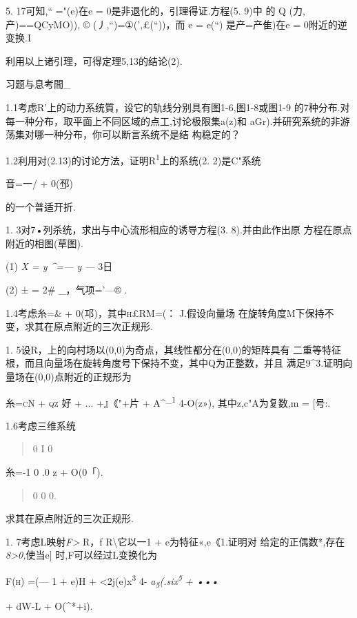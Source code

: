 \documentclass{article}
\begin{document}
5. 17可知,`` ="(e)在e = 0是非退化的，引理得证.方程(5. 9)中 的 Q
(力,产)==QCyMO)), © (丿,``)=①(',£(``))，而 e = e(``) 是产=产隹)在e =
0附近的逆变换.I

利用以上诸引理，可得定理5,13的结论(2).

习题与息考間\_

1.1考虑R'上的动力系统質，设它的轨线分别具有图1-6,图1-8或图1-9
的7种分布.对每一种分布，取平面上不同区域的点工,讨论极限集a(z)和
aGr).并研究系统的非游荡集对哪一种分布，你可以断言系统不是结 构稳定的？

1.2利用对(2.13)的讨论方法，证明R\textsuperscript{1}上的系统(2.
2)是C"系统

音=一/ + 0(\textbar{}邳)

的一个普适开折.

1. 3对7•列杀统，求出与中心流形相应的诱导方程(3. 8).并由此作出原
方程在原点附近的相图(草图).

(1) \emph{X = y \^{}=--- y ---} 3日

(2) ± = 2\# \_，气项='---® .

1.4考虑糸=\& + 0(\textbar{}邛)，其中\textsc{h£RM=(：} J.假设向量场
在旋转角度M下保持不变，求其在原点附近的三次正规形.

1. 5设R，上的向村场以(0,0)为奇点，其线性都分在(0,0)的矩阵具有
二重等特征根，而且向量场在旋转角度号下保持不变，其中Q为正整数，并且
满足9\^{}3.证明向量场在(0,0)点附近的正规形为

糸=\textsc{cN + qz} 好 + ... +』《"+片 + A\^{}\textsuperscript{\_1}
4-O(\textbar{}z\textbar{}»), 其中z,c"A为复数,m = {[}号:\textbar{}.

1.6考虑三维系统

\begin{quote}
0 I 0
\end{quote}

糸=-1 0 .0 z + O(0「).

\begin{quote}
0 0 0.
\end{quote}

求其在原点附近的三次正规形.

1. 7考虑L映射\emph{F\textgreater{}} R，f R\textbackslash{}它以一1 +
e为特征«,\textbar{}e\textbar{}《1.证明对
给定的正偶数*,存在\emph{8\textgreater{}0,}使当\textbar{}e{]}
时,F可以经过L变换化为

\textsc{F(h)} =(--- 1 + e)H + \textless{}2j(e)x\textsuperscript{3} 4-
\emph{a\textsubscript{5}(.six\textsuperscript{5} + •••}

+ dW-L + O(\textbar{}\^{}\textbar{}*+i).
\end{document}
